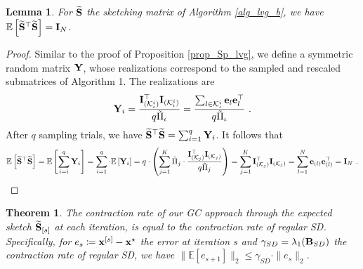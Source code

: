 \documentclass[journal,letterpaper,onecolumn,twoside,nofonttune]{IEEEtran}
\newcommand{\E}{\mathbb{E}}
\newcommand{\K}{\mathcal{K}}
\newcommand{\eb}{\bold{e}}
\newcommand{\xb}{\bold{x}}
\newcommand{\Bb}{\bold{B}}
\newcommand{\Ib}{\bold{I}}
\newcommand{\Sb}{\bold{S}}
\newcommand{\Sbwt}{\widetilde{\Sb}}
\newcommand{\Yb}{\bold{Y}}
\newcommand{\Pit}{\tilde{\Pi}}
\newtheorem{Thm}{Theorem}
\newtheorem{Lemma}{Lemma}
\begin{document}
\begin{Lemma}
\label{lem_exp_StS}
For $\Sbwt$ the sketching matrix of Algorithm \ref{alg_lvg_b}, we have $\E\left[\Sbwt^\top\Sbwt\right]=\Ib_N$.
\end{Lemma}

\begin{proof}
Similar to the proof of Proposition \ref{prop_Sp_lvg}, we define a symmetric random matrix $\Yb$, whose realizations correspond to the sampled and rescaled submatrices of Algorithm 1. The realizations are
$$ \Yb_i = \frac{\Ib_{(\K_\iota^i)}^\top\Ib_{(\K_\iota^i)}}{q\Pit_\iota} = \frac{\sum_{l\in\K_\iota^i}\eb_l\eb_l^\top}{q\Pit_\iota}\ . $$
After $q$ sampling trials, we have $\Sbwt^\top\Sbwt=\sum_{i=1}^q\Yb_i$. It follows that
$$ \E\left[\Sbwt^\top\Sbwt\right] = \E\left[\sum_{i=i}^q\Yb_i\right] = \sum_{i=1}^q\cdot\E\left[\Yb_i\right] = q\cdot \left(\sum_{j=1}^K\Pit_j\cdot\frac{\Ib_{(\K_j)}^\top\Ib_{(\K_j)}}{q\Pit_j}\right) = \sum_{j=1}^K\Ib_{(\K_j)}^\top\Ib_{(\K_j)} = \sum_{l=1}^N\eb_{(l)}\eb_{(l)}^\top = \Ib_N\ . $$
\end{proof}

\begin{Thm}
\label{contr_rate_thm}
The contraction rate of our GC approach through the expected sketch $\Sbwt_{[s]}$ at each iteration, is equal to the contraction rate of regular SD. Specifically, for $e_s\coloneqq\xb^{[s]}-\xb^\star$ the error at iteration $s$ and $\gamma_{SD}=\lambda_1(\Bb_{SD})$ the contraction rate of regular SD, we have $\big\|\E[e_{s+1}]\big\|_2\leqslant\gamma_{SD}\cdot\|e_s\|_2$.
\end{Thm}
\end{document}
